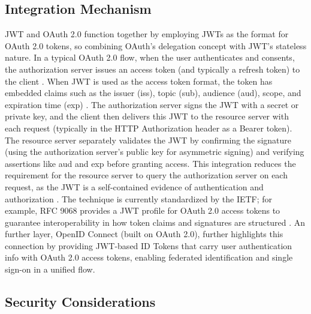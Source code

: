 \documentclass[a4paper,10pt]{report}
\begin{document}
\subsection{Integration Mechanism}

JWT and OAuth 2.0 function together by employing JWTs as the format for OAuth 2.0 tokens, so combining OAuth’s delegation concept with JWT’s stateless nature.  In a typical OAuth 2.0 flow, when the user authenticates and consents, the authorization server issues an access token (and typically a refresh token) to the client \cite{hardt2012oauth}.  When JWT is used as the access token format, the token has embedded claims such as the issuer (iss), topic (sub), audience (aud), scope, and expiration time (exp) \cite{bradley2015jwt, bertocci2021rfc9068}.  The authorization server signs the JWT with a secret or private key, and the client then delivers this JWT to the resource server with each request (typically in the HTTP Authorization header as a Bearer token).  The resource server separately validates the JWT by confirming the signature (using the authorization server’s public key for asymmetric signing) and verifying assertions like aud and exp before granting access.  This integration reduces the requirement for the resource server to query the authorization server on each request, as the JWT is a self-contained evidence of authentication and authorization \cite{solapurkar2016healthcare}.  The technique is currently standardized by the IETF; for example, RFC 9068 provides a JWT profile for OAuth 2.0 access tokens to guarantee interoperability in how token claims and signatures are structured \cite{bertocci2021rfc9068}.  An further layer, OpenID Connect (built on OAuth 2.0), further highlights this connection by providing JWT-based ID Tokens that carry user authentication info with OAuth 2.0 access tokens, enabling federated identification and single sign-on in a unified flow.

\subsection{Security Considerations}
\end{document}
